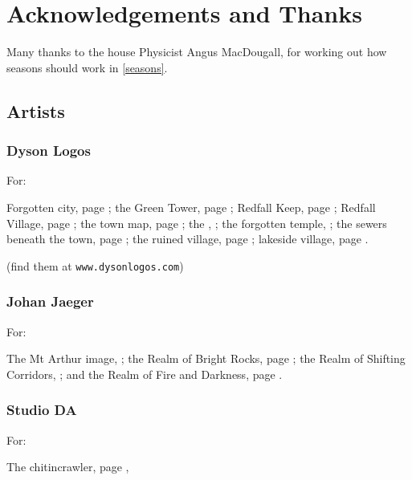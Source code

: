 
\section*{Acknowledgements and Thanks}

\begin{multicols}{2}

Many thanks to the house Physicist Angus MacDougall, for working out how seasons should work in \autoref{seasons}.

\subsection*{Artists}

\subsubsection{Dyson Logos}

For:

Forgotten city, page \pageref{Dyson_Logos/forgotten_city};
the Green Tower, page \pageref{Dyson_Logos/green_tower};
Redfall Keep, page \pageref{Dyson_Logos/redfall_keep};
Redfall Village, page \pageref{Dyson_Logos/redfall};
the town map, page \pageref{Dyson_Logos/town};
the , \pageref{Dyson_Logos/mincing_pig};
the forgotten temple, \pageref{Dyson_Logos/qualme_temple};
the sewers beneath the town, page \pageref{Dyson_Logos/sewer};
the ruined village, page \pageref{Dyson_Logos/ruined_village};
lakeside village, page \pageref{Dyson_Logos/lakeside}.

(find them at {\tt www.dysonlogos.com})

\subsubsection{Johan Jaeger}

For:

The Mt Arthur image, \pageref{Johan_Jaeger/mountain_river};
the Realm of Bright Rocks, page \pageref{Johan_Jaeger/desert_wizard};
the Realm of Shifting Corridors, \pageref{Johan_Jaeger/ancient_rocks};
and the Realm of Fire and Darkness, page \pageref{Johan_Jaeger/a_light_in_the_dark}.
\subsubsection{Studio DA}

For:

The chitincrawler, page \pageref{Studio_DA/chitincrawler},


\end{multicols}
